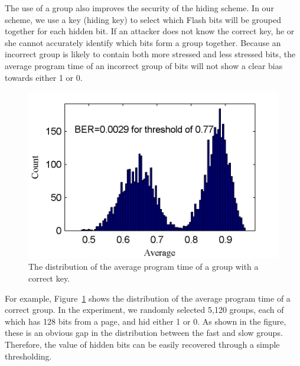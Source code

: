 The use of a group also improves the security of the hiding scheme. In our scheme,
we use a key (hiding key) to select which Flash bits will be grouped together for
each hidden bit. If an attacker does not know the correct key, he or she cannot 
accurately identify which bits form a group together. 
Because an incorrect group is likely to contain both more stressed and less stressed
bits, the average program time of an incorrect group of bits will not show a clear
bias towards either 1 or 0. 


\begin{figure} 
\begin{center} 
\includegraphics[width=\mywidth]{figs/5e3_histo_withkey.png} 
\caption{The distribution of the average program time of a group with a correct key.}
\label{fig:withkey_10blocks} 
\vspace{-0.1in}
\end{center} 
\end{figure} 

For example, Figure~\ref{fig:withkey_10blocks} shows the distribution of
the average program time of a correct group. In the experiment, we randomly selected
5,120 groups, each of which has 128 bits from a page, and hid either 1 or 0. 
As shown in the figure, these is an obvious gap in the distribution
between the fast and slow groups. Therefore, the value of hidden bits 
can be easily recovered through a simple thresholding. 


